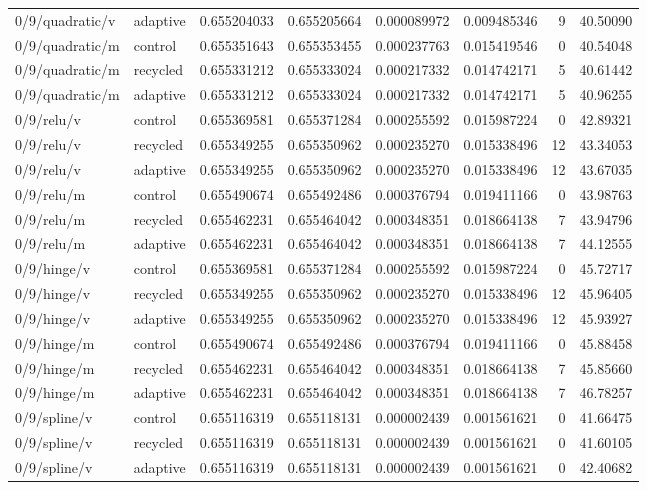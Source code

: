 \begin{longtable}{llrrrrrr}
0/9/quadratic/v & adaptive & 0.655204033 & 0.655205664 & 0.000089972 & 0.009485346 & 9 & 40.50090 \\
0/9/quadratic/m & control & 0.655351643 & 0.655353455 & 0.000237763 & 0.015419546 & 0 & 40.54048 \\
0/9/quadratic/m & recycled & 0.655331212 & 0.655333024 & 0.000217332 & 0.014742171 & 5 & 40.61442 \\
0/9/quadratic/m & adaptive & 0.655331212 & 0.655333024 & 0.000217332 & 0.014742171 & 5 & 40.96255 \\
0/9/relu/v & control & 0.655369581 & 0.655371284 & 0.000255592 & 0.015987224 & 0 & 42.89321 \\
0/9/relu/v & recycled & 0.655349255 & 0.655350962 & 0.000235270 & 0.015338496 & 12 & 43.34053 \\
0/9/relu/v & adaptive & 0.655349255 & 0.655350962 & 0.000235270 & 0.015338496 & 12 & 43.67035 \\
0/9/relu/m & control & 0.655490674 & 0.655492486 & 0.000376794 & 0.019411166 & 0 & 43.98763 \\
0/9/relu/m & recycled & 0.655462231 & 0.655464042 & 0.000348351 & 0.018664138 & 7 & 43.94796 \\
0/9/relu/m & adaptive & 0.655462231 & 0.655464042 & 0.000348351 & 0.018664138 & 7 & 44.12555 \\
0/9/hinge/v & control & 0.655369581 & 0.655371284 & 0.000255592 & 0.015987224 & 0 & 45.72717 \\
0/9/hinge/v & recycled & 0.655349255 & 0.655350962 & 0.000235270 & 0.015338496 & 12 & 45.96405 \\
0/9/hinge/v & adaptive & 0.655349255 & 0.655350962 & 0.000235270 & 0.015338496 & 12 & 45.93927 \\
0/9/hinge/m & control & 0.655490674 & 0.655492486 & 0.000376794 & 0.019411166 & 0 & 45.88458 \\
0/9/hinge/m & recycled & 0.655462231 & 0.655464042 & 0.000348351 & 0.018664138 & 7 & 45.85660 \\
0/9/hinge/m & adaptive & 0.655462231 & 0.655464042 & 0.000348351 & 0.018664138 & 7 & 46.78257 \\
0/9/spline/v & control & 0.655116319 & 0.655118131 & 0.000002439 & 0.001561621 & 0 & 41.66475 \\
0/9/spline/v & recycled & 0.655116319 & 0.655118131 & 0.000002439 & 0.001561621 & 0 & 41.60105 \\
0/9/spline/v & adaptive & 0.655116319 & 0.655118131 & 0.000002439 & 0.001561621 & 0 & 42.40682 \\

\end{longtable}
